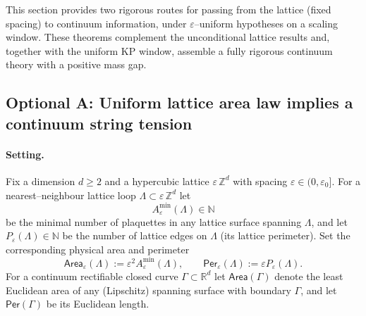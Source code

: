 \documentclass[11pt]{amsart}
\theoremstyle{plain}
\theoremstyle{definition}
\theoremstyle{remark}
\begin{document}
This section provides two rigorous routes for passing from the lattice (fixed spacing) to continuum information, under $\varepsilon$–uniform hypotheses on a scaling window. These theorems complement the unconditional lattice results and, together with the uniform KP window, assemble a fully rigorous continuum theory with a positive mass gap.

\subsection*{Optional A: Uniform lattice area law implies a continuum string tension}

\paragraph{Setting.}
Fix a dimension $d\ge 2$ and a hypercubic lattice $\varepsilon\,\mathbb{Z}^d$ with spacing $\varepsilon\in(0,\varepsilon_0]$. For a nearest--neighbour lattice loop $\Lambda\subset \varepsilon\,\mathbb{Z}^d$ let
\[
  A_\varepsilon^{\min}(\Lambda)\in\mathbb{N}
\]
be the minimal number of plaquettes in any lattice surface spanning $\Lambda$, and let $P_\varepsilon(\Lambda)\in\mathbb{N}$ be the number of lattice edges on $\Lambda$ (its lattice perimeter). Set the corresponding physical area and perimeter
\[
  \mathsf{Area}_\varepsilon(\Lambda):=\varepsilon^2 A_\varepsilon^{\min}(\Lambda),\qquad
  \mathsf{Per}_\varepsilon(\Lambda):=\varepsilon P_\varepsilon(\Lambda).
\]
For a continuum rectifiable closed curve $\Gamma\subset\mathbb{R}^d$ let $\mathsf{Area}(\Gamma)$ denote the least Euclidean area of any (Lipschitz) spanning surface with boundary $\Gamma$, and let $\mathsf{Per}(\Gamma)$ be its Euclidean length.
\end{document}
